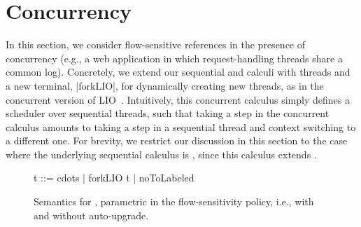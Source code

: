 \section{Concurrency}
\label{sec:conc}

In this section, we consider flow-sensitive references in the presence
of concurrency (e.g., a web application in which request-handling
threads share a common log).
%
Concretely, we extend our sequential \liofs{} and \lioafs{} calculi with
threads and a new terminal, |forkLIO|, for dynamically creating new threads, as
in the concurrent version of LIO~\cite{stefan:addressing-covert}.
%
Intuitively, this concurrent calculus \lioconc{} simply defines a scheduler over
sequential threads, such that taking a step in the concurrent calculus amounts
to taking a step in a sequential thread and context switching to a different
one.
%
For brevity, we restrict our discussion in this section to the case where the
underlying sequential calculus is \lioafs{}, since this calculus extends
\liofs.

\begin{figure}
\small
\begin{code}
t    ::= cdots  | forkLIO t | noToLabeled
\end{code}
  \caption{Semantics for \lioconc{}, parametric in the flow-sensitivity policy,
  i.e., with and without auto-upgrade\label{fig:sos:conc}.}
\end{figure}

